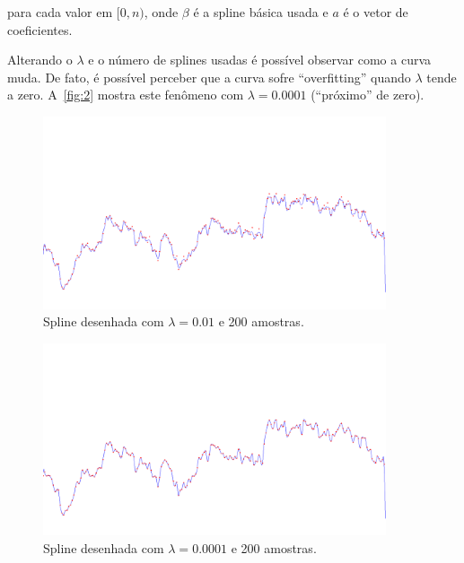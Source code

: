 \documentclass[12pt]{article}
\theoremstyle{plain}
\numberwithin{equation}{section}
\begin{document}
para cada valor em $[0,n)$, onde $\beta$ é a spline básica usada e $a$ é o vetor de coeficientes.

Alterando o $\lambda$ e o número de splines usadas é possível observar como a curva muda. De fato,
é possível perceber que a curva sofre ``overfitting'' quando $\lambda$ tende a zero.
A~\autoref{fig:2} mostra este fenômeno com $\lambda=0.0001$ (``próximo'' de zero).
\begin{figure}[h]
  \centering\includegraphics[width=0.9\textwidth]{imgs/200_0-01.png}
  \caption{Spline desenhada com $\lambda=0.01$ e 200 amostras.\label{fig:1}}
\end{figure}
\begin{figure}[H]
  \centering\includegraphics[width=0.9\textwidth]{imgs/200_0-0001.png}
  \caption{Spline desenhada com $\lambda=0.0001$ e 200 amostras.\label{fig:2}}
\end{figure}
\end{document}
